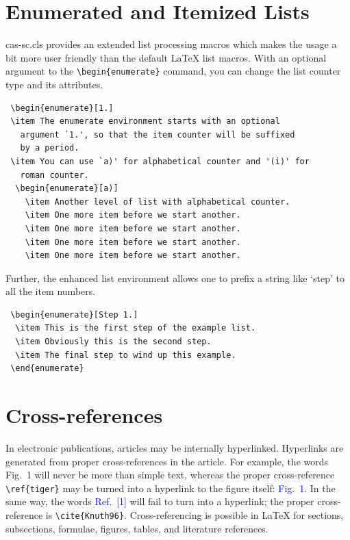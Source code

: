 \documentclass[a4paper,fleqn]{cas-sc}
\begin{document}
\section[Enumerated ...]{Enumerated and Itemized Lists}
{cas-sc.cls} provides an extended list processing macros
which makes the usage a bit more user friendly than the default
\LaTeX{} list macros.   With an optional argument to the
\verb+\begin{enumerate}+ command, you can change the list counter
type and its attributes.

\begin{verbatim}
 \begin{enumerate}[1.]
 \item The enumerate environment starts with an optional
   argument `1.', so that the item counter will be suffixed
   by a period.
 \item You can use `a)' for alphabetical counter and '(i)' for
   roman counter.
  \begin{enumerate}[a)]
    \item Another level of list with alphabetical counter.
    \item One more item before we start another.
    \item One more item before we start another.
    \item One more item before we start another.
    \item One more item before we start another.
\end{verbatim}

Further, the enhanced list environment allows one to prefix a
string like `step' to all the item numbers.

\begin{verbatim}
 \begin{enumerate}[Step 1.]
  \item This is the first step of the example list.
  \item Obviously this is the second step.
  \item The final step to wind up this example.
 \end{enumerate}
\end{verbatim}

\section{Cross-references}
In electronic publications, articles may be internally
hyperlinked. Hyperlinks are generated from proper
cross-references in the article.  For example, the words
\textcolor{black!80}{Fig.~1} will never be more than simple text,
whereas the proper cross-reference \verb+\ref{tiger}+ may be
turned into a hyperlink to the figure itself:
\textcolor{blue}{Fig.~1}.  In the same way,
the words \textcolor{blue}{Ref.~[1]} will fail to turn into a
hyperlink; the proper cross-reference is \verb+\cite{Knuth96}+.
Cross-referencing is possible in \LaTeX{} for sections,
subsections, formulae, figures, tables, and literature
references.
\end{document}
